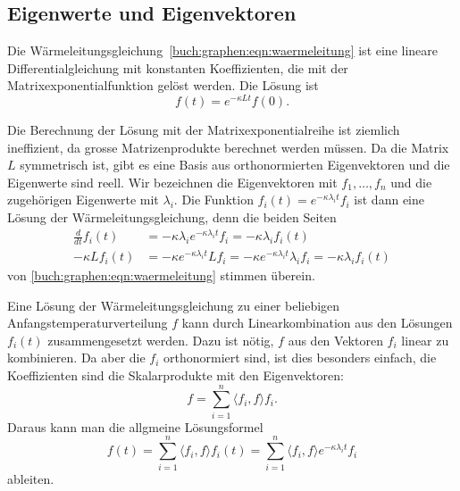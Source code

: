 \subsection{Eigenwerte und Eigenvektoren
\label{buch:subsection:ein-zyklischer-graph}}
Die Wärmeleitungsgleichung~\eqref{buch:graphen:eqn:waermeleitung} 
ist eine lineare Differentialgleichung mit konstanten Koeffizienten,
die mit der Matrixexponentialfunktion gelöst werden.
Die Lösung ist
\[
f(t) = e^{-\kappa Lt}f(0).
\]

Die Berechnung der Lösung mit der Matrixexponentialreihe ist ziemlich
ineffizient, da grosse Matrizenprodukte berechnet werden müssen.
Da die Matrix $L$ symmetrisch ist, gibt es eine Basis aus 
orthonormierten Eigenvektoren und die Eigenwerte sind reell.
Wir bezeichnen die Eigenvektoren mit $f_1,\dots,f_n$  und die
zugehörigen Eigenwerte mit $\lambda_i$.
Die Funktion $f_i(t)= e^{-\kappa\lambda_it}f_i$ ist dann eine Lösung
der Wärmeleitungsgleichung, denn die beiden Seiten
\begin{align*}
\frac{d}{dt}f_i(t)
&=
-\kappa\lambda_ie^{-\kappa\lambda_it}f_i
=
-\kappa\lambda_i f_i(t)
\\
-\kappa Lf_i(t)
&=
-\kappa e^{-\kappa\lambda_it} Lf_i
=
-\kappa e^{-\kappa\lambda_it} \lambda_i f_i
=
-\kappa \lambda_i f_i(t)
\end{align*}
von \eqref{buch:graphen:eqn:waermeleitung} stimmen überein.

Eine Lösung der Wärmeleitungsgleichung zu einer beliebigen
Anfangstemperaturverteilung $f$ kann durch Linearkombination aus 
den Lösungen $f_i(t)$ zusammengesetzt werden.
Dazu ist nötig, $f$ aus den Vektoren $f_i$ linear zu kombinieren.
Da aber die $f_i$ orthonormiert sind, ist dies besonders einfach,
die Koeffizienten sind die Skalarprodukte mit den Eigenvektoren:
\[
f=\sum_{i=1}^n \langle f_i,f\rangle f_i.
\]
Daraus kann man die allgmeine Lösungsformel
\begin{equation}
f(t)
=
\sum_{i=1}^n \langle f_i,f\rangle f_i(t)
=
\sum_{i=1}^n \langle f_i,f\rangle e^{-\kappa\lambda_i t}f_i
\label{buch:graphen:eqn:eigloesung}
\end{equation}
ableiten.

